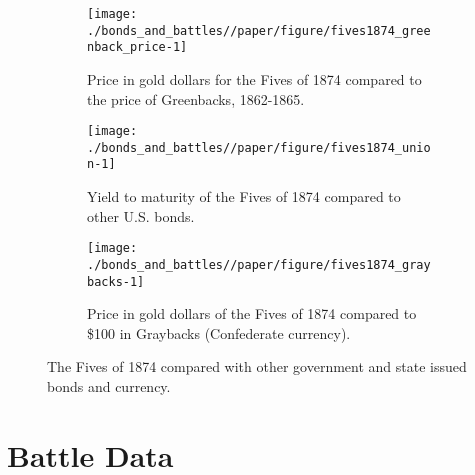 \begin{figure}[!htpb]
  \begin{subfigure}[t]{0.45\linewidth}
    \texttt{[image: ./bonds\_and\_battles//paper/figure/fives1874\_greenback\_price-1]}
  \caption{Price in gold dollars for the Fives of 1874 compared to the price of Greenbacks, 1862-1865.}
  \label{bonds:fig:fives1874_greenbacks}
\end{subfigure}%
\hspace{0.1\linewidth}%
\begin{subfigure}[t]{0.45\linewidth}
    \texttt{[image: ./bonds\_and\_battles//paper/figure/fives1874\_union-1]}
    \caption{Yield to maturity of the Fives of 1874 compared to other U.S. bonds.}
  \label{bonds:fig:fives1874_union}
\end{subfigure}
\begin{subfigure}[t]{0.45\linewidth}
  \texttt{[image: ./bonds\_and\_battles//paper/figure/fives1874\_graybacks-1]}
  \caption{Price in gold dollars of the Fives of 1874 compared to \$100 in Graybacks (Confederate currency).}
\label{bonds:fig:fives1874_grayback}
\end{subfigure}
\caption{The Fives of 1874 compared with other government and state issued bonds and currency.}
\label{bonds:fig:fives1874_compared}
\end{figure}



\section{Battle Data}
\label{sec:battle-data}

